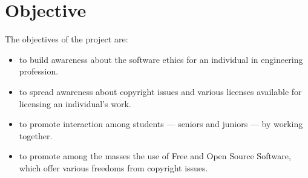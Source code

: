 \chapter{Objective}

The objectives of the project are:
\begin{itemize}
\item to build awareness about the software ethics for an individual in engineering profession.
\item to spread awareness about copyright issues and various licenses available for licensing an individual's work.
\item to promote interaction among students --- seniors and juniors --- by working together.
\item to promote among the masses the use of Free and Open Source Software, which offer various freedoms from copyright issues.
\end{itemize}
